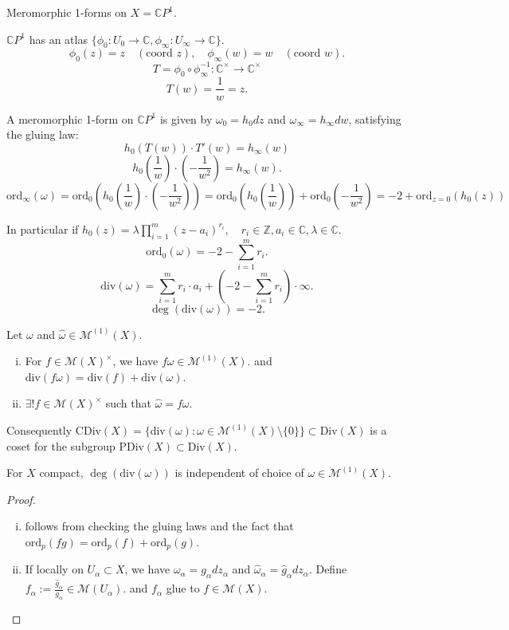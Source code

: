 \documentclass{article}
\begin{document}
\begin{example}
Meromorphic 1-forms on $X = \mathbb{C} P^1$.

$\mathbb{C} P^1$ has an atlas $\{ \phi_0: U_0 \to \mathbb{C}, \phi_\infty: U_\infty \to \mathbb{C} \}$.
$$\phi_0(z) = z \quad (\text{coord } z), \quad \phi_\infty(w) = w \quad (\text{coord } w).$$
$$T = \phi_0 \circ \phi_\infty^{-1}: \mathbb{C}^\times \to \mathbb{C}^\times$$
$$T(w) = \frac{1}{w} = z.$$

A meromorphic 1-form on $\mathbb{C} P^1$ is given by $\omega_0 = h_0 dz$ and
$\omega_\infty = h_\infty dw$, satisfying the gluing law:
$$h_0(T(w)) \cdot T'(w) = h_\infty(w)$$
$$h_0(\frac{1}{w}) \cdot (-\frac{1}{w^2}) = h_\infty(w).$$
$$\mathrm{ord}_\infty(\omega) = \mathrm{ord}_0(h_0(\frac{1}{w}) \cdot (-\frac{1}{w^2})) = \mathrm{ord}_0(h_0(\frac{1}{w})) + \mathrm{ord}_0(-\frac{1}{w^2}) = -2 + \mathrm{ord}_{z=0}(h_0(z))$$

In particular if $h_0(z) = \lambda \prod_{i=1}^m (z-a_i)^{r_i}, \quad r_i \in \mathbb{Z}, a_i \in \mathbb{C}, \lambda \in \mathbb{C}$.
$$\mathrm{ord}_0(\omega) = -2 - \sum_{i=1}^m r_i.$$
$$\mathrm{div}(\omega) = \sum_{i=1}^m r_i \cdot a_i + (-2 - \sum_{i=1}^m r_i) \cdot \infty.$$
$$\deg(\mathrm{div}(\omega)) = -2.$$
\end{example}
\begin{lemma}
Let $\omega$ and $\hat{\omega} \in \mathcal{M}^{(1)}(X)$.
\begin{enumerate}[(i)]
    \item For $f \in \mathcal{M}(X)^\times$, we have $f\omega \in \mathcal{M}^{(1)}(X)$.
    and $\mathrm{div}(f\omega) = \mathrm{div}(f) + \mathrm{div}(\omega)$.
    \item $\exists ! f \in \mathcal{M}(X)^\times$ such that $\hat{\omega} = f\omega$.
\end{enumerate}
Consequently $\mathrm{CDiv}(X) = \{ \mathrm{div}(\omega): \omega \in \mathcal{M}^{(1)}(X) \setminus \{0\} \} \subset \mathrm{Div}(X)$
is a coset for the subgroup $\mathrm{PDiv}(X) \subset \mathrm{Div}(X)$.

For $X$ compact, $\deg(\mathrm{div}(\omega))$ is independent of choice of $\omega \in \mathcal{M}^{(1)}(X)$.
\end{lemma}

\begin{proof}
\begin{enumerate}[(i)]
    \item follows from checking the gluing laws and the fact that $\mathrm{ord}_p(fg) = \mathrm{ord}_p(f) + \mathrm{ord}_p(g)$.
    \item If locally on $U_\alpha \subset X$, we have $\omega_\alpha = g_\alpha dz_\alpha$ and $\hat{\omega}_\alpha = \hat{g}_\alpha dz_\alpha$. Define $f_\alpha := \frac{\hat{g}_\alpha}{g_\alpha} \in \mathcal{M}(U_\alpha)$.
    and $f_\alpha$ glue to $f \in \mathcal{M}(X)$.
\end{enumerate}
\end{proof}
\end{document}
